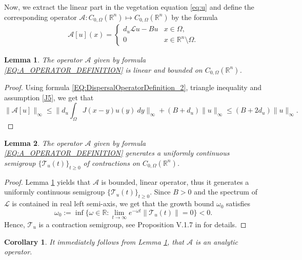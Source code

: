 \documentclass[12pt, a4paper]{article}
\theoremstyle{break}
\theoremstyle{break}
\theoremstyle{break}
\theoremstyle{break}
\theoremstyle{break}
\newtheorem{lem}{Lemma}[section]
\theoremstyle{break}
\newtheorem{cor}{Corollary}[section]
\theoremstyle{break}
\begin{document}
Now, we extract the linear part in the vegetation equation \eqref{eq:u} and define the corresponding operator $\mathcal{A}: C_{0, \Omega}(\mathbb{R}^n) \mapsto C_{0, \Omega}(\mathbb{R}^n)$ by the formula
\begin{align}
    \label{EQ:A_OPERATOR_DEFINITION}
    \mathcal{A}[u](x) =
    \begin{cases}
        d_u\mathcal{L}u - Bu &x \in \Omega, \\
        0 &x \in \mathbb{R}^n \setminus \Omega.
    \end{cases}
\end{align}
\begin{lem}
    \label{lem:A_BOUNDED_DENSE_LINEAR}
    The operator $\mathcal{A}$ given by formula \eqref{EQ:A_OPERATOR_DEFINITION} is linear and bounded on $C_{0, \Omega}(\mathbb{R}^n)$.
\end{lem}
\begin{proof}
    Using formula \eqref{EQ:DispersalOperatorDefinition_2}, triangle inequality and assumption \ref{J5}, we get that
    \begin{equation*}
        \| \mathcal{A}[u] \|_\infty \leq \| d_u\int_\Omega J(x-y) u(y)\:dy \|_\infty + (B+d_u) \|u\|_\infty \leq (B+2d_u)\|u\|_\infty.
    \end{equation*}
\end{proof}
\begin{lem}
    \label{lem:A_SEMIGROUP_GENERATOR}
    The operator $\mathcal{A}$ given by formula \eqref{EQ:A_OPERATOR_DEFINITION} generates a uniformly continuous semigroup $\{\mathcal{T}_u(t)\}_{t \geq 0}$ of contractions on $C_{0, \Omega}(\mathbb{R}^n)$.
\end{lem}
\begin{proof}
    Lemma \ref{lem:A_BOUNDED_DENSE_LINEAR} yields that $\mathcal{A}$ is bounded, linear operator, thus it generates a uniformly continuous semigroup $\{\mathcal{T}_u(t)\}_{t \geq 0}$. Since $B > 0$ and the spectrum of $\mathcal{L}$ is contained in real left semi-axis, we get that the growth bound $\omega_0$ satisfies
    \begin{equation*}
        \omega_0 := \inf\{\omega \in \mathbb{R}: \lim_{t \rightarrow \infty} e^{-\omega t} \|\mathcal{T}_u(t)\| = 0 \} < 0.
    \end{equation*}
    Hence, $\mathcal{T}_u$ is a contraction semigroup, see Proposition V.1.7 in \cite{EngelNagel2000} for details.
\end{proof}
\begin{cor}
    It immediately follows from Lemma \ref{lem:A_BOUNDED_DENSE_LINEAR}, that $\mathcal{A}$ is an analytic operator.
\end{cor}
\end{document}
